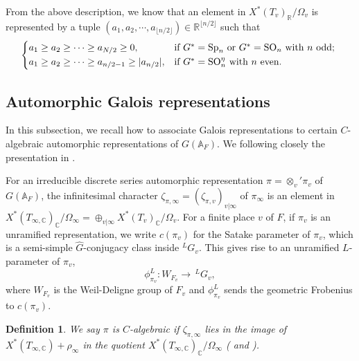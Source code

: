 \documentclass[12pt,oneside,reqno]{amsart}
\newcommand{\R}{\mathbb{R}}
\theoremstyle{plain}
\newtheorem{definition}[theorem]{Definition}
\begin{document}
	
	
	From the above description, we know that an element in $X^\ast(T_v)_\R/\Omega_v$ is represented by a tuple $(a_1,a_2,\cdots,a_{\lfloor n/2\rfloor})\in\R^{\lfloor n/2\rfloor}$ such that
	\begin{equation}\label{a_1>a_2...}
		\begin{cases*}
			a_1\ge a_2\ge\cdots\ge a_{N/2}\ge0,
			&
			if $G^\ast=\mathrm{Sp}_n$ or $G^\ast=\mathrm{SO}_n$ with $n$ odd;
			\\
			a_1\ge a_2\ge\cdots\ge a_{n/2-1}\ge|a_{n/2}|,
			&
			if $G^\ast=\mathrm{SO}_n^\eta$ with $n$ even.
		\end{cases*}
	\end{equation}
	
	
	
	
	
	
	
	
	
	
	
	
	
	
	
	
	
	\subsection{Automorphic Galois representations}\label{Automorphic Galois representations}
	In this subsection, we recall how to associate Galois representations to certain $C$-algebraic automorphic representations of $G(\mathbb{A}_F)$. We following closely the presentation in \cite{Shin2024}.
	
	
	
	For an irreducible discrete series automorphic representation $\pi=\otimes_v'\pi_v$ of $G(\mathbb{A}_F)$, the infinitesimal character $\zeta_{\pi,\infty}=(\zeta_{\pi,v})_{v|\infty}$ of $\pi_{\infty}$
	is an element in $X^\ast(T_{\infty,\mathbb{C}})_{\mathbb{C}}/\Omega_\infty=\oplus_{v|\infty} X^\ast(T_v)_{\mathbb{C}}/\Omega_v$. For a finite place $v$ of $F$, if $\pi_v$ is an unramified representation, we write $c(\pi_v)$ for the Satake parameter of $\pi_v$, which is a semi-simple $\widehat{G}$-conjugacy class inside $^LG_v$. This gives rise to an unramified $L$-parameter of $\pi_v$,
	\[
	\phi_{\pi_v}^L\colon W_{F_v}\to\,^LG_v,
	\]
	where $W_{F_v}$ is the Weil-Deligne group of $F_v$ and $\phi_{\pi_v}^L$ sends the geometric Frobenius to $c(\pi_v)$.
	\begin{definition}\label{C-algebraic}
		We say $\pi$ is \emph{$C$-algebraic} if $\zeta_{\pi,\infty}$ lies in the image of $X^\ast(T_{\infty,\mathbb{C}})+\rho_\infty$ in the quotient $X^\ast(T_{\infty,\mathbb{C}})_{\mathbb{C}}/\Omega_\infty$ (\cite[§3]{BuzzardGee2014} and \cite[Definition 3.1.1]{Shin2024}).
	\end{definition}
    
\end{document}
